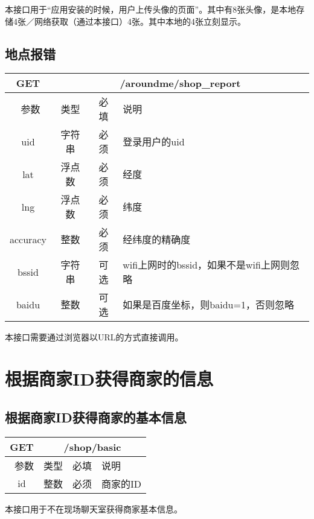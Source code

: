 \documentclass[cs4size]{ctexartutf8}
\begin{document}
本接口用于“应用安装的时候，用户上传头像的页面”。其中有8张头像，是本地存储4张／网络获取（通过本接口）4张。其中本地的4张立刻显示。


\subsection{地点报错}

\begin{table}[H]
   \begin{center}
\begin{tabular}{|c|c|c|p{12cm}|}
\hline
GET & \multicolumn{3}{|c|}{/aroundme/shop\_report} \\
\hline\hline
 \  参数  & 类型 & 必填 &  说明  \\
 \hline
 uid  & 字符串 & 必须 & 登录用户的uid\\
\hline
 lat  & 浮点数 & 必须 & 经度\\
\hline
 lng  &  浮点数 & 必须 & 纬度\\ 
\hline
 accuracy  & 整数 & 必须 & 经纬度的精确度\\ 
\hline
 bssid  & 字符串 & 可选 & wifi上网时的bssid，如果不是wifi上网则忽略\\  
\hline
 baidu  & 整数 & 可选 & 如果是百度坐标，则baidu=1，否则忽略\\  
\hline
\end{tabular}
   \end{center}
\end{table}

本接口需要通过浏览器以URL的方式直接调用。



\section{根据商家ID获得商家的信息}

\subsection{根据商家ID获得商家的基本信息}

\begin{table}[H]
   \begin{center}
\begin{tabular}{|c|c|c|p{12cm}|}
\hline
GET & \multicolumn{3}{|c|}{/shop/basic} \\
\hline\hline
 \  参数  & 类型 & 必填 &  说明  \\
\hline
 id  & 整数 & 必须 & 商家的ID\\
\hline
\end{tabular}
   \end{center}
\end{table}
本接口用于不在现场聊天室获得商家基本信息。
\end{document}
